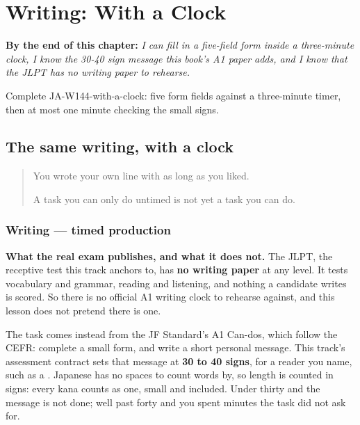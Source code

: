 
\chapter{Writing: With a Clock}
\label{ch:ja-writing-with-a-clock}

\begin{chapteropening}
\textbf{By the end of this chapter:} \emph{I can fill in a five-field form inside a three-minute clock, I know the 30-40 sign message this book's A1 paper adds, and I know that the JLPT has no writing paper to rehearse.}

Complete JA-W144-with-a-clock: five form fields against a three-minute timer, then at most one minute checking the small signs.
\end{chapteropening}

\section[Practice]{The same writing, with a clock}

\label{lesson:JA-W144-with-a-clock}



\begin{quote}
You wrote your own line with as long as you liked.

A task you can only do untimed is not yet a task you can do.
\end{quote}

\subsection*{Writing — timed production}
\textbf{What the real exam publishes, and what it does not.} The JLPT, the receptive test this track anchors to, has \textbf{no writing paper} at any level. It tests vocabulary and grammar, reading and listening, and nothing a candidate writes is scored. So there is no official A1 writing clock to rehearse against, and this lesson does not pretend there is one.

The task comes instead from the JF Standard's A1 Can-dos, which follow the CEFR: complete a small form, and write a short personal message. This track's assessment contract sets that message at \textbf{30 to 40 signs}, for a reader you name, such as a \textbf{}. Japanese has no spaces to count words by, so length is counted in signs: every kana counts as one, small \textbf{} and \textbf{} included. Under thirty and the message is not done; well past forty and you spent minutes the task did not ask for.

